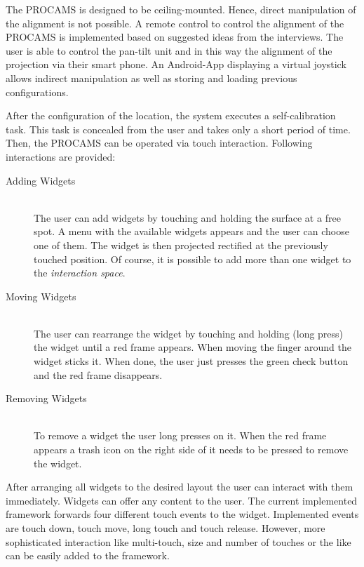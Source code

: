 The PROCAMS is designed to be ceiling-mounted. Hence, direct manipulation of the alignment is not possible. 
A remote control to control the alignment of the PROCAMS is implemented based on suggested ideas from the interviews. The user is able to control the pan-tilt unit and in this way the alignment of the projection via their smart phone. An Android-App displaying a virtual joystick allows indirect  manipulation as well as storing and loading previous configurations. 

After the configuration of the location, the system executes a self-calibration task. This task is concealed from the user and takes only a short period of time. Then, the PROCAMS can be operated via touch interaction. Following interactions are provided: 
 
\begin{description}
\item[Adding Widgets]  \hfill \\
The user can add widgets by touching and holding the surface at a free spot. A menu with the available widgets appears and the user can choose one of them. The widget is then projected rectified at the previously touched position. Of course, it is possible to add more than one widget to the \emph{interaction space}. 

\item[Moving Widgets] \hfill \\
The user can rearrange the widget by touching and holding (long press) the widget until a red frame appears. When moving the finger around the widget sticks it. When done, the user just presses the green check button and the red frame disappears.

\item[Removing Widgets]\hfill \\
To remove a widget the user long presses on it. When the red frame appears a trash icon on the right side of it needs to be pressed to remove the widget.
\end{description}

After arranging all widgets to the desired layout the user can interact with them immediately. Widgets can offer any content to the user. The current implemented framework forwards four different touch events to the widget. Implemented events are touch down, touch move, long touch and touch release. However, more sophisticated interaction like multi-touch, size and number of touches or the like \cite{Xiao:2013dp} can be easily added to the framework.


